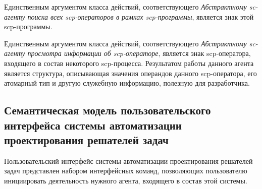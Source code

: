 Единственным аргументом класса действий, соответствующего \textit{Абстрактному sc-агенту поиска всех scp-операторов в рамках scp-программы}, является знак этой scp-программы.

Единственным аргументом класса действий, соответствующего \textit{Абстрактному sc-агенту просмотра информации об scp-операторе}, является знак scp-оператора, входящего в состав некоторого scp-процесса. Результатом работы данного агента является структура, описывающая значения операндов данного scp-оператора, его атомарный тип и другую служебную информацию, полезную для разработчика.

\subsection{Семантическая модель пользовательского интерфейса системы автоматизации проектирования решателей задач}

Пользовательский интерфейс системы автоматизации проектирования решателей задач представлен набором интерфейсных команд, позволяющих пользователю инициировать деятельность нужного агента, входящего в состав этой системы.

